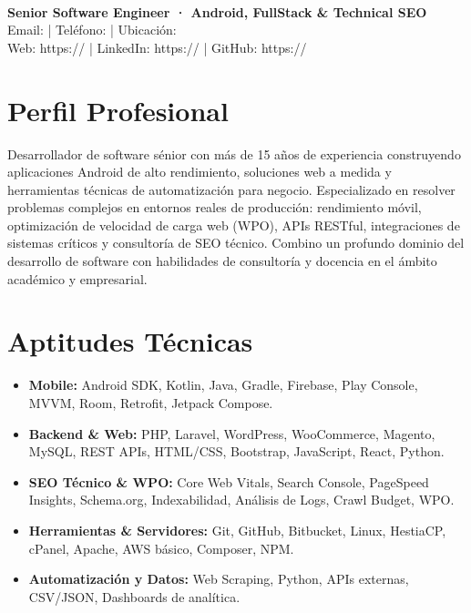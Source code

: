 \documentclass[10pt,a4paper]{article}
\begin{document}
\begin{center}
  {\Huge\bfseries \myname} \\
  \vspace{0.4em}
  {\large\bfseries Senior Software Engineer · Android, FullStack \& Technical SEO} \\
  \vspace{0.6em}
  Email: \myemail{} | Teléfono: \myphone{} | Ubicación: \mylocation{} \\
  Web: https://\myweb{} | LinkedIn: https://\mylinkedin{} | GitHub: https://\mygithub{}
\end{center}

\vspace{0.6em}

\section{Perfil Profesional}
Desarrollador de software sénior con más de 15 años de experiencia construyendo aplicaciones Android de alto rendimiento, soluciones web a medida y herramientas técnicas de automatización para negocio. Especializado en resolver problemas complejos en entornos reales de producción: rendimiento móvil, optimización de velocidad de carga web (WPO), APIs RESTful, integraciones de sistemas críticos y consultoría de SEO técnico. Combino un profundo dominio del desarrollo de software con habilidades de consultoría y docencia en el ámbito académico y empresarial.

\section{Aptitudes Técnicas}
\begin{itemize}
  \item \textbf{Mobile:} Android SDK, Kotlin, Java, Gradle, Firebase, Play Console, MVVM, Room, Retrofit, Jetpack Compose.
  \item \textbf{Backend \& Web:} PHP, Laravel, WordPress, WooCommerce, Magento, MySQL, REST APIs, HTML/CSS, Bootstrap, JavaScript, React, Python.
  \item \textbf{SEO Técnico \& WPO:} Core Web Vitals, Search Console, PageSpeed Insights, Schema.org, Indexabilidad, Análisis de Logs, Crawl Budget, WPO.
  \item \textbf{Herramientas \& Servidores:} Git, GitHub, Bitbucket, Linux, HestiaCP, cPanel, Apache, AWS básico, Composer, NPM.
  \item \textbf{Automatización y Datos:} Web Scraping, Python, APIs externas, CSV/JSON, Dashboards de analítica.
\end{itemize}
\end{document}
